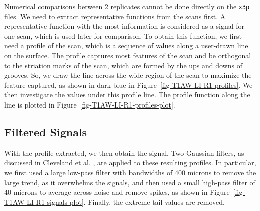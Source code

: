 \documentclass[fleqn,10pt]{wlscirep}
\begin{document}
Numerical comparisons between 2 replicates cannot be done directly on
the \texttt{x3p} files. We need to extract representative functions from
the scans first. A representative function with the most information is
considered as a signal for one scan, which is used later for comparison.
To obtain this function, we first need a profile of the scan, which is a
sequence of values along a user-drawn line on the surface. The profile
captures most features of the scan and be orthogonal to the striation
marks of the scan, which are formed by the ups and downs of grooves. So,
we draw the line across the wide region of the scan to maximize the
feature captured, as shown in dark blue in
Figure~\ref{fig-T1AW-LI-R1-profiles}. We then investigate the values
under this profile line. The profile function along the line is plotted
in Figure~\ref{fig-T1AW-LI-R1-profiles-plot}.

\subsection*{Filtered Signals}\label{sec-filtered-signals}

With the profile extracted, we then obtain the signal. Two Gaussian
filters, as discussed in Cleveland et al.
\citep{clevelandLocalRegressionModels1992}, are applied to these
resulting profiles. In particular, we first used a large low-pass filter
with bandwidths of 400 microns to remove the large trend, as it
overwhelms the signals, and then used a small high-pass filter of 40
microns to average across noise and remove spikes, as shown in
Figure~\ref{fig-T1AW-LI-R1-signals-plot}. Finally, the extreme tail
values are removed.
\end{document}
